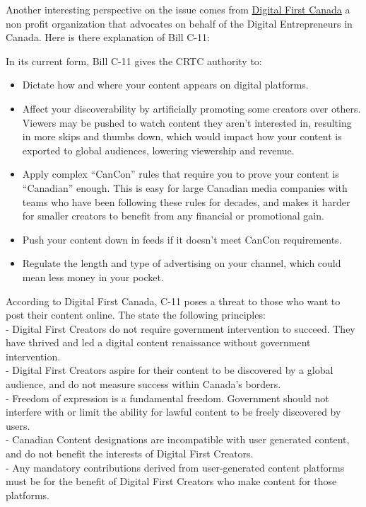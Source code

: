 \documentclass[
]{book}
\providecommand{\tightlist}{%
  \setlength{\itemsep}{0pt}\setlength{\parskip}{0pt}}
\theoremstyle{definition}
\theoremstyle{definition}
\theoremstyle{definition}
\theoremstyle{definition}
\theoremstyle{remark}
\begin{document}
\begin{reflect}
Another interesting perspective on the issue comes from \href{https://digitalfirstcanada.ca/fix-c11/}{Digital First Canada} a non profit organization that advocates on behalf of the Digital Entrepreneurs in Canada. Here is there explanation of Bill C-11:

In its current form, Bill C-11 gives the CRTC authority to:

\begin{itemize}
\tightlist
\item
  Dictate how and where your content appears on digital platforms.\\
\item
  Affect your discoverability by artificially promoting some creators over others. Viewers may be pushed to watch content they aren't interested in, resulting in more skips and thumbs down, which would impact how your content is exported to global audiences, lowering viewership and revenue.\\
\item
  Apply complex ``CanCon'' rules that require you to prove your content is ``Canadian'' enough. This is easy for large Canadian media companies with teams who have been following these rules for decades, and makes it harder for smaller creators to benefit from any financial or promotional gain.\\
\item
  Push your content down in feeds if it doesn't meet CanCon requirements.\\
\item
  Regulate the length and type of advertising on your channel, which could mean less money in your pocket.
\end{itemize}

According to Digital First Canada, C-11 poses a threat to those who want to post their content online. The state the following principles:\\
- Digital First Creators do not require government intervention to succeed. They have thrived and led a digital content renaissance without government intervention.\\
- Digital First Creators aspire for their content to be discovered by a global audience, and do not measure success within Canada's borders.\\
- Freedom of expression is a fundamental freedom. Government should not interfere with or limit the ability for lawful content to be freely discovered by users.\\
- Canadian Content designations are incompatible with user generated content, and do not benefit the interests of Digital First Creators.\\
- Any mandatory contributions derived from user-generated content platforms must be for the benefit of Digital First Creators who make content for those platforms.


\end{reflect}
\end{document}
